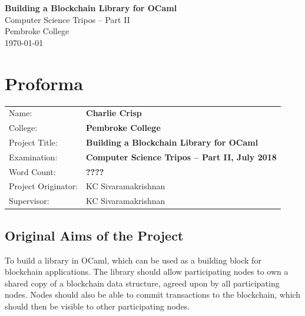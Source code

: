 \documentclass[12pt,a4paper,twoside,openright]{report}
\begin{document}
	\pagestyle{empty}
	
	
	\vspace*{60mm}
	\begin{center}
	\Huge
	\textbf{Building a Blockchain Library for OCaml} \\[5mm]
	Computer Science Tripos -- Part II \\[5mm]
	Pembroke College \\[5mm]
	\today  %
	\end{center}
	
	
	\pagestyle{plain}
	
	\chapter*{Proforma}
	
	{\large
	\begin{tabular}{ll}
	Name:               & \bf Charlie Crisp                       \\
	College:            & \bf Pembroke College                     \\
	Project Title:      & \bf Building a Blockchain Library for OCaml \\
	Examination:        & \bf Computer Science Tripos -- Part II, July 2018  \\
	Word Count:         & \bf ????\footnotemark[1]\\
	Project Originator: & KC Sivaramakrishnan                    \\
	Supervisor:         & KC Sivaramakrishnan                    
	\end{tabular}
	}
	
	
	\section*{Original Aims of the Project}
	
	To build a library in OCaml, which can be used as a building block for blockchain applications. 
	The library should allow participating nodes to own a shared copy of a blockchain data structure, agreed upon by all participating nodes.
	Nodes should also be able to commit transactions to the blockchain, which should then be visible to other participating nodes. 
	
\end{document}
